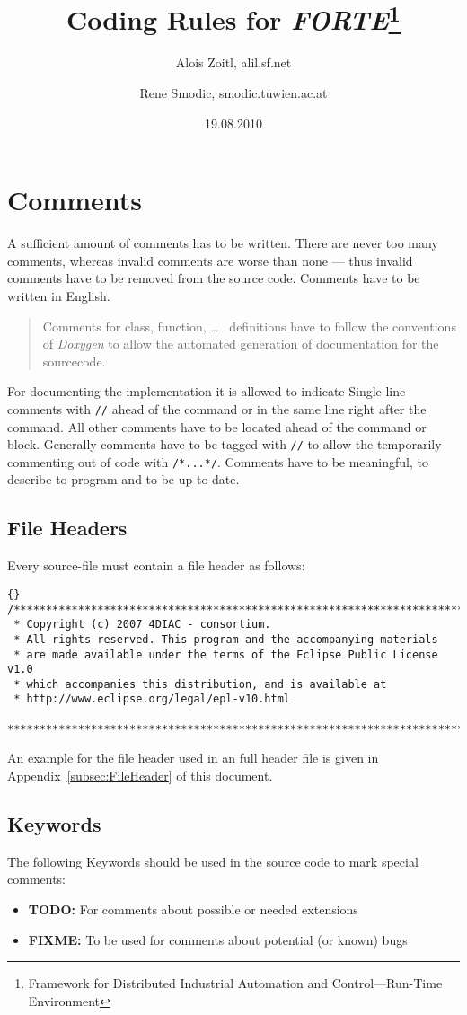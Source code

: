 \documentclass[final,a4paper,10pt, oneside]{article}
\title{Coding Rules for \emph{FORTE}\footnote{Framework for Distributed Industrial Automation and Control---Run-Time Environment}}
\author{Alois Zoitl, alil\@@users.sf.net \and Rene Smodic, smodic\@@acin.tuwien.ac.at}
\date{19.08.2010}
\begin{document}
\maketitle

\tableofcontents

\section{Comments}
A sufficient amount of comments has to be written. There are never too many comments, whereas invalid comments are worse than none --- thus
invalid comments have to be removed from the source code. Comments have to be written in English. 

\begin{quote}
Comments for class, function, \ldots~ definitions have to follow the conventions of \emph{Doxygen} to allow the automated generation of documentation for the sourcecode. 
\end{quote}

For documenting the implementation it is allowed to indicate Single-line
comments with \verb|//| ahead of the command or in the same line right after the command. All other comments have to be located ahead of the
command or block. Generally comments have to be tagged with \verb|//| to allow the temporarily commenting out of code with \verb|/*...*/|.
Comments have to be meaningful, to describe to program and to be up to date.


\subsection{File Headers}
Every source-file must contain a file header as follows:
\begin{lstlisting}[frame=trbl]{}
/*******************************************************************************
 * Copyright (c) 2007 4DIAC - consortium.
 * All rights reserved. This program and the accompanying materials
 * are made available under the terms of the Eclipse Public License v1.0
 * which accompanies this distribution, and is available at
 * http://www.eclipse.org/legal/epl-v10.html
 *******************************************************************************
\end{lstlisting}
An example for the file header used in an full header file is given in Appendix~\ref{subsec:FileHeader} of this document.

\subsection{Keywords}
The following Keywords should be used in the source code to mark special comments:
\begin{itemize}
	\item \textbf{TODO:} For comments about possible or needed extensions
	\item \textbf{FIXME:} To be used for comments about potential (or known) bugs
\end{itemize}
\end{document}
